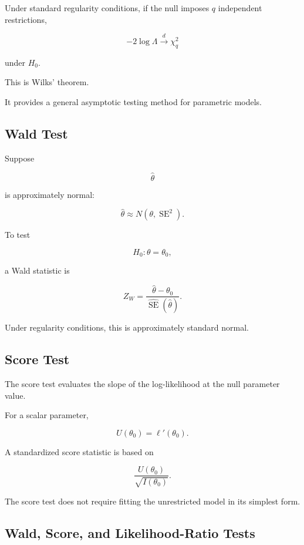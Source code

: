 Under standard regularity conditions, if the null imposes \(q\)
independent restrictions,

\[
\boxed{
-2\log\Lambda
\xrightarrow{d}
\chi^2_q
}
\]

under \(H_0\).

This is Wilks' theorem.

It provides a general asymptotic testing method for parametric models.

\subsection{Wald Test}
\label{subsec:wald-test}

Suppose

\[
\widehat{\theta}
\]

is approximately normal:

\[
\widehat{\theta}
\approx
N
(
\theta,
\operatorname{SE}^2
).
\]

To test

\[
H_0:\theta=\theta_0,
\]

a Wald statistic is

\[
\boxed{
Z_W
=
\frac{
\widehat{\theta}-\theta_0
}{
\widehat{\operatorname{SE}}(\widehat{\theta})
}.
}
\]

Under regularity conditions, this is approximately standard normal.

\subsection{Score Test}
\label{subsec:score-test}

The score test evaluates the slope of the log-likelihood at the null
parameter value.

For a scalar parameter,

\[
\boxed{
U(\theta_0)
=
\ell'(\theta_0).
}
\]

A standardized score statistic is based on

\[
\boxed{
\frac{
U(\theta_0)
}{
\sqrt{
I(\theta_0)
}
}.
}
\]

The score test does not require fitting the unrestricted model in its
simplest form.

\subsection{Wald, Score, and Likelihood-Ratio Tests}
\label{subsec:wald-score-lr}

